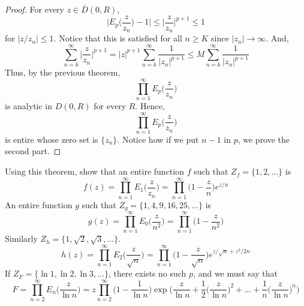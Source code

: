 \vspace{2ex}
\begin{proof}
For every $z\in \bar{D}(0,R)$,
\[\Big|E_{p}\Big(\dfrac{z}{z_{n}}\Big)-1\Big|\leq \Big|\dfrac{z}{z_{n}}\Big|^{p+1}\leq 1\]
for $|z/z_{n}|\leq 1$. Notice that this is satisfied for all $n\geq K$ since $|z_{n}|\rightarrow \infty $. And,
\[\sum ^{\infty }_{n=k}\Big|\dfrac{z}{z_{n}}\Big|^{p+1}=|z|^{p+1}\sum ^{\infty }_{n=k}\dfrac{1}{|z_{n}|^{p+1}}\leq M\sum ^{\infty }_{n=k}\dfrac{1}{|z_{n}|^{p+1}}\]
Thus, by the previous theorem,
\[\prod^{\infty }_{n=1}E_{p}\Big(\dfrac{z}{z_{n}}\Big)\]
is analytic in $D(0,R)$ for every $R$. Hence,
\[\prod^{\infty }_{n=1}E_{p}\Big(\dfrac{z}{z_{n}}\Big)\]
is entire whose zero set is $\{z_{n}\}$. Notice how if we put $n-1$ in $p$, we prove the second part.
\end{proof}
\vspace{2ex}
\begin{ex}
Using this theorem, show that an entire function $f$ such that $Z_{f}=\{1,2,\ldots \}$ is 
\[f(z)=\prod^{\infty }_{n=1}E_{1}\Big(\dfrac{z}{z_{n}}\Big)=\prod^{\infty }_{n=1}\Big(1-\dfrac{z}{n}\Big)e^{z/n}\]
An entire function $g$ such that $Z_{g}=\{1,4,9,16,25,\ldots \}$ is
\[g(z)=\prod^{\infty }_{n=1}E_0\Big(\dfrac{z}{n^2}\Big)=\prod^{\infty }_{n=1}\Big(1-\dfrac{z}{n^2}\Big)\]
Similarly $Z_{h}=\{1,\sqrt{2},\sqrt{3},\ldots \}$.
\[h(z)=\prod^{\infty }_{n=1}E_2\Big(\dfrac{z}{\sqrt{n}}\Big)=\prod^{\infty }_{n=1}\Big(1-\dfrac{z}{\sqrt{n}}\Big)e^{z/\sqrt{n}+z^2/2n}\]
If $Z_{F}=\{\ln 1,\ln 2,\ln 3,\ldots \}$, there exists no such $p$, and we must say that
\[F=\prod^{\infty }_{n=2}E_{n}\Big(\dfrac{z}{\ln n}\Big)=z\prod^{\infty }_{n=2}\Big(1-\dfrac{1}{\ln n}\Big)\exp \Big(\dfrac{z}{\ln n}+\dfrac{1}{2}\Big(\dfrac{z}{\ln n}\Big)^2+\ldots +\dfrac{1}{n}\Big(\dfrac{z}{\ln n}\Big)^{n}\Big)\]
\end{ex}
\vspace{2ex}

